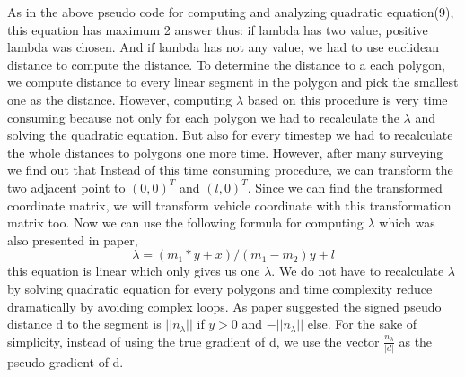 \documentclass[conference]{IEEEtran}
\makeatletter
\def\BState{\State\hskip-\ALG@thistlm}
\makeatother
\begin{document}
\begin{algorithm}
\end{algorithm}

As in the above pseudo code for computing and analyzing quadratic equation(9), this equation has maximum 2 answer thus: if lambda has two value, positive lambda was chosen. And if lambda has not any value, we had to use euclidean distance to compute the distance. To determine the distance to a each polygon, we compute distance to every linear segment in the polygon and pick the smallest one as the distance. However, computing $\lambda$ based on this procedure is very time consuming because not only for each polygon we had to recalculate the $\lambda$ and solving the quadratic equation. But also for every timestep we had to recalculate the whole distances to polygons one more time. However, after many surveying we find out that Instead of this time consuming procedure, we can transform the two adjacent point to $(0,0)^T$ and $(l,0)^T$. Since we can find the transformed coordinate matrix, we will transform vehicle coordinate with this transformation matrix too. Now we can use the following formula for computing $\lambda$ which was also presented in paper,
\begin{equation}
\lambda = (m_1*y+x)/(m_1-m_2)y+l
\end{equation}
this equation is linear which only gives us one $\lambda$. We do not have to recalculate $\lambda$ by solving quadratic equation for every polygons and time complexity reduce dramatically by avoiding complex loops.
As paper suggested the signed pseudo distance d to the segment is $||{n_\lambda}||$ if
$y > 0$ and $-||{n_\lambda}||$ else. For the sake of simplicity, instead
of using the true gradient of d, we use the vector $\frac{n_\lambda}{|d|}$ as the
pseudo gradient of d.\\
\end{document}
